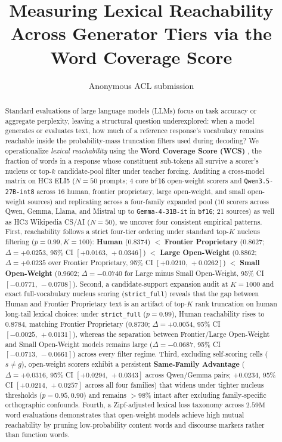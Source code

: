 \documentclass[11pt]{article}
\title{Measuring Lexical Reachability Across Generator Tiers via the Word Coverage Score}
\author{Anonymous ACL submission}
\begin{document}
\maketitle

\begin{abstract}
Standard evaluations of large language models (LLMs) focus on task accuracy or aggregate perplexity, leaving a structural question underexplored: when a model generates or evaluates text, how much of a reference response's vocabulary remains reachable inside the probability-mass truncation filters used during decoding? We operationalize \emph{lexical reachability} using the \textbf{Word Coverage Score (WCS)} \citep{wcs2026}, the fraction of words in a response whose constituent sub-tokens all survive a scorer's nucleus or top-$k$ candidate-pool filter under teacher forcing. Auditing a cross-model matrix on HC3 ELI5 ($N=50$ prompts; $4$ core \texttt{bf16} open-weight scorers and \texttt{Qwen3.5-27B-int8} across $16$ human, frontier proprietary, large open-weight, and small open-weight sources) and replicating across a four-family expanded pool ($10$ scorers across Qwen, Gemma, Llama, and Mistral up to \texttt{Gemma-4-31B-it} in \texttt{bf16}; $21$ sources) as well as HC3 Wikipedia CS/AI ($N=50$), we uncover four consistent empirical patterns. First, reachability follows a strict four-tier ordering under standard top-$K$ nucleus filtering ($p=0.99, K=100$): \textbf{Human} ($0.8374$) $<$ \textbf{Frontier Proprietary} ($0.8627$; $\Delta = +0.0253$, 95\% CI $[+0.0163,\,+0.0346]$) $<$ \textbf{Large Open-Weight} ($0.8862$; $\Delta = +0.0235$ over Frontier Proprietary, 95\% CI $[+0.0210,\,+0.0262]$) $<$ \textbf{Small Open-Weight} ($0.9602$; $\Delta = -0.0740$ for Large minus Small Open-Weight, 95\% CI $[-0.0771,\,-0.0708]$). Second, a candidate-support expansion audit at $K=1000$ and exact full-vocabulary nucleus scoring (\texttt{strict\_full}) reveals that the gap between Human and Frontier Proprietary text is an artifact of top-$K$ rank truncation on human long-tail lexical choices: under \texttt{strict\_full} ($p=0.99$), Human reachability rises to $0.8784$, matching Frontier Proprietary ($0.8730$; $\Delta = +0.0054$, 95\% CI $[-0.0025,\,+0.0131]$), whereas the separation between Frontier/Large Open-Weight and Small Open-Weight models remains large ($\Delta = -0.0687$, 95\% CI $[-0.0713,\,-0.0661]$) across every filter regime. Third, excluding self-scoring cells ($s \neq g$), open-weight scorers exhibit a persistent \textbf{Same-Family Advantage} ($\Delta = +0.0316$, 95\% CI $[+0.0294,\,+0.0343]$ across Qwen/Gemma pairs; $+0.0234$, 95\% CI $[+0.0214,\,+0.0257]$ across all four families) that widens under tighter nucleus thresholds ($p=0.95, 0.90$) and remains $>98\%$ intact after excluding family-specific orthographic confounds. Fourth, a Zipf-adjusted lexical loss taxonomy across $2.59\text{M}$ word evaluations demonstrates that open-weight models achieve high mutual reachability by pruning low-probability content words and discourse markers rather than function words.
\end{abstract}
\end{document}
